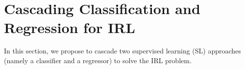 \documentclass{llncs}
\newcommand{\0}{\mathbf{0}}
\newcommand{\1}{\mathbf{1}}
\begin{document}
\section{Cascading Classification and Regression for IRL}
\label{section: Cascading}
In this section, we propose to cascade two supervised learning (SL) approaches (namely a classifier and a regressor) to solve the IRL problem.
\end{document}
